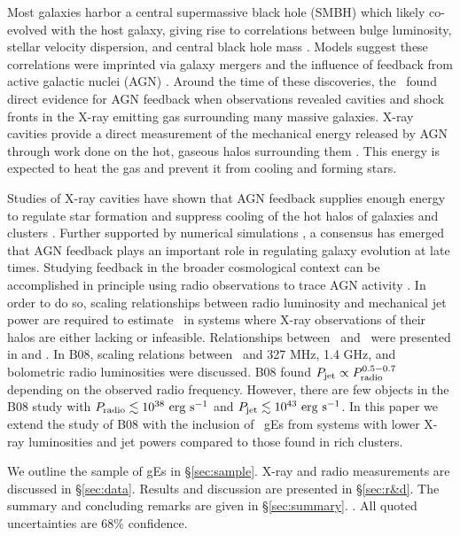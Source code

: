 \documentclass[12pt, preprint]{aastex}
\begin{document}
Most galaxies harbor a central supermassive black hole (SMBH) which
likely co-evolved with the host galaxy, giving rise to correlations
between bulge luminosity, stellar velocity dispersion, and central
black hole mass \citep{1995ARA&A..33..581K, magorrian}. Models suggest
these correlations were imprinted via galaxy mergers and the influence
of feedback from active galactic nuclei (AGN)
\citep[\eg][]{1998A&A...331L...1S, 2000MNRAS.311..576K}. Around the
time of these discoveries, the \cxo\ found direct evidence for AGN
feedback when observations revealed cavities and shock fronts in the
X-ray emitting gas surrounding many massive galaxies. X-ray cavities
provide a direct measurement of the mechanical energy released by AGN
through work done on the hot, gaseous halos surrounding them
\citep{2000ApJ...534L.135M}. This energy is expected to heat the gas
\citep{2001ApJ...554..261C} and prevent it from cooling and forming
stars.

Studies of X-ray cavities have shown that AGN feedback supplies enough
energy to regulate star formation and suppress cooling of the hot
halos of galaxies and clusters \citep{birzan04, 2005MNRAS.364.1343D,
  rafferty06}. Further supported by numerical simulations
\citep[\eg][]{croton06, bower06}, a consensus has emerged that AGN
feedback plays an important role in regulating galaxy evolution at
late times. Studying feedback in the broader cosmological context can
be accomplished in principle using radio observations to trace AGN
activity \citep[\eg][]{best07}. In order to do so, scaling
relationships between radio luminosity and mechanical jet power are
required to estimate \pjet\ in systems where X-ray observations of
their halos are either lacking or infeasible. Relationships between
\pjet\ and \prad\ were presented in \citet[][hereafter B04]{birzan04}
and \citet[][hereafter B08]{birzan08}. In B08, scaling relations
between \pjet\ and 327 MHz, 1.4 GHz, and bolometric radio luminosities
were discussed. B08 found $P_{\rm{jet}} \propto P_{\rm{radio}}^{0.5-0.7}$ depending on
the observed radio frequency. However, there are few objects in the
B08 study with $P_{\rm{radio}} \lesssim 10^{38} ~\rm{\mbox{\ensuremath{\rm{erg}}}~\ensuremath{\rm{\mbox{\ensuremath{\rm{s}}}^{-1}}}}$ and $P_{\rm{jet}} \lesssim
10^{43} ~\rm{\mbox{\ensuremath{\rm{erg}}}~\ensuremath{\rm{\mbox{\ensuremath{\rm{s}}}^{-1}}}}$. In this paper we extend the study of B08 with the
inclusion of \samp\ gEs from systems with lower X-ray luminosities and
jet powers compared to those found in rich clusters.

We outline the sample of gEs in \S\ref{sec:sample}. X-ray and radio
measurements are discussed in \S\ref{sec:data}. Results and discussion
are presented in \S\ref{sec:r&d}. The summary and concluding remarks
are given in \S\ref{sec:summary}. \LCDM. All quoted uncertainties are
68\% confidence.
\end{document}
